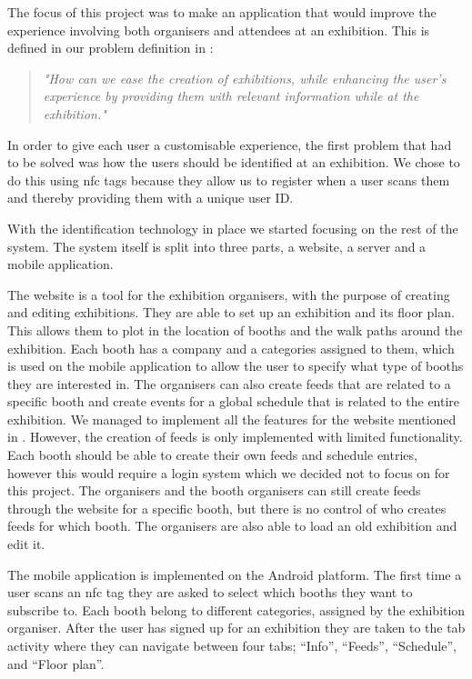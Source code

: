 The focus of this project was to make an application that would improve the experience involving both organisers and attendees at an exhibition.
This is defined in our problem definition in :
\begin{quote}
\textit{"How can we ease the creation of exhibitions, while enhancing the user's experience by providing them with relevant information while at the exhibition."}
\end{quote}
In order to give each user a customisable experience, the first problem that had to be solved was how the users should be identified at an exhibition. We chose to do this using \ac{nfc} tags because they allow us to register when a user scans them and thereby providing them with a unique user ID.
 
With the identification technology in place we started focusing on the rest of the system. The system itself is split into three parts, a website, a server and a mobile application.

The website is a tool for the exhibition organisers, with the purpose of creating and editing exhibitions. They are able to set up an exhibition and its floor plan. This allows them to plot in the location of booths and the walk paths around the exhibition. Each booth has a company and a categories assigned to them, which is used on the mobile application to allow the user to specify what type of booths they are interested in. The organisers can also create feeds that are related to a specific booth and create events for a global schedule that is related to the entire exhibition. We managed to implement all the features for the website mentioned in . However, the creation of feeds is only implemented with limited functionality. Each booth should be able to create their own feeds and schedule entries, however this would require a login system which we decided not to focus on for this project. The organisers and the booth organisers can still create feeds through the website for a specific booth, but there is no control of who creates feeds for which booth. The organisers are also able to load an old exhibition and edit it.

The mobile application is implemented on the Android platform. The first time a user scans an \ac{nfc} tag they are asked to select which booths they want to subscribe to. Each booth belong to different categories, assigned by the exhibition organiser. After the user has signed up for an exhibition they are taken to the tab activity where they can navigate between four tabs; ``Info'', ``Feeds'', ``Schedule'', and ``Floor plan''.

